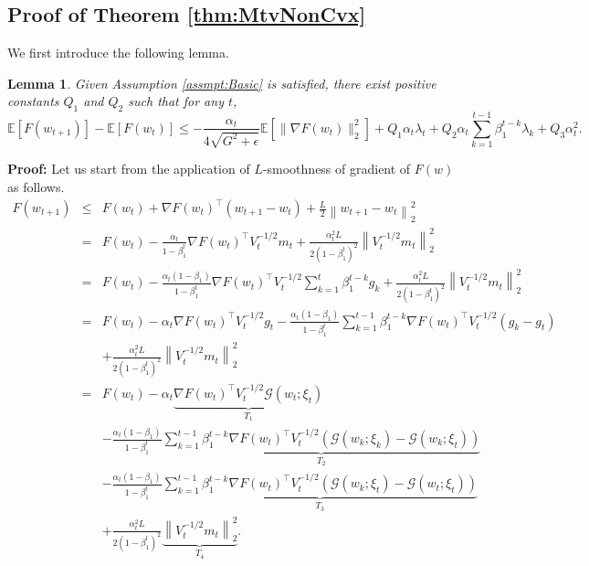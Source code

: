 \documentclass[twoside]{article}
\def\EE{\mathbb{E}}
\def\GG{\mathcal{G}}
\newtheorem{lemma}{Lemma}
\begin{document}
\subsection{Proof of Theorem \ref{thm:MtvNonCvx}}
We first introduce the following lemma.
\begin{lemma}
\label{lem:BoundStepMotiv}
Given Assumption \ref{assmpt:Basic} is satisfied,  there exist positive constants $Q_1$ and $Q_2$ such that for any $t$, 
\begin{equation*}
    \EE[F(w_{t+1})] - \EE[F(w_t)] \leq -\frac{\alpha_t}{4\sqrt{G^2 + \epsilon}} \EE\left[\|\nabla F(w_t)\|_2^2\right] + Q_1 \alpha_t\lambda_t + Q_2 \alpha_t \sum_{k=1}^{t-1}\beta_1^{t-k}\lambda_k +Q_3 \alpha_t^2.
\end{equation*}
\end{lemma}
\textbf{Proof:}
Let us start from the application of $L$-smoothness of gradient of $F(w)$ as follows.
\begin{eqnarray}
\label{main}
F(w_{t+1}) &\leq& F(w_t) + \nabla F(w_t) ^{\top} (w_{t+1} - w_t) + \frac{L}{2}\left\|w_{t+1} - w_t\right\|_2^2  \nonumber\\
&=& F(w_t) -\frac{\alpha_t}{1-\beta_1^{t}} \nabla F(w_t) ^{\top} V_t^{-1/2} m_t + \frac{\alpha_t^2L}{2(1-\beta_1^t)^2} \left\|V_t^{-1/2} m_t \right\|_2^2 \nonumber\\
&=& F(w_t) - \frac{\alpha_t(1-\beta_1)}{1-\beta_1^t} \nabla F(w_t)^{\top} V_t^{-1/2} \sum_{k=1}^t \beta_1^{t-k} g_k + \frac{\alpha_t^2 L}{2(1-\beta_1^t)^2}\left\| V_t^{-1/2} m_t\right\|_2^2 \nonumber\\
&=& F(w_t) -  \alpha_t \nabla F(w_t)^{\top} V_t^{-1/2} g_t- \frac{\alpha_t (1-\beta_1)}{1-\beta_1^t}  \sum_{k=1}^{t-1} \beta_1^{t-k}\nabla F(w_t)^\top V_t^{-1/2}(g_k-g_t) \nonumber\\
&& +  \frac{\alpha_t^2 L}{2(1-\beta_1^t)^2} \left\| V_t^{-1/2} m_t\right\|_2^2\nonumber\\
&=& F(w_t) - \alpha_t\underbrace{ \nabla F(w_t)^{\top} V_t^{-1/2}\GG(w_t;\xi_t)}_{T_1}\nonumber\\
&& -\frac{\alpha_t(1-\beta_1)}{1-\beta_1^t}\underbrace{ \sum_{k=1}^{t-1}\beta_1^{t-k} \nabla F(w_t)^{\top} V_t^{-1/2}\left(\GG(w_k;\xi_k) - \GG(w_k;\xi_t)\right)}_{T_2}\nonumber\\
&&- \frac{\alpha_t(1-\beta_1)}{1-\beta_1^t} \underbrace{\sum_{k=1}^{t-1}\beta_1^{t-k} \nabla F(w_t)^{\top} V_t^{-1/2}\left(\GG(w_k;\xi_t) - \GG(w_t;\xi_t)\right) }_{T_3}\nonumber\\
&&+ \frac{\alpha_t^2 L}{2(1-\beta_1^t)^2}\underbrace{\left\|V_t^{-1/2}m_t\right\|_2^2}_{T_4}.\nonumber
\end{eqnarray}
\end{document}
